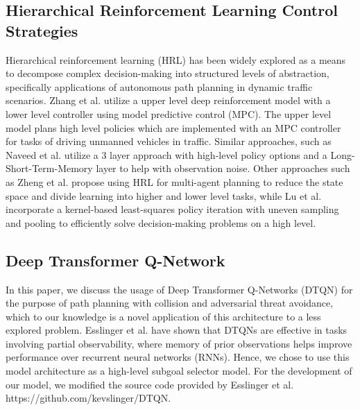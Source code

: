 \documentclass[letterpaper, 10 pt, conference]{ieeeconf}
\begin{document}
\subsection{Hierarchical Reinforcement Learning Control Strategies}

Hierarchical reinforcement learning (HRL) has been widely explored as a means to decompose complex decision-making into structured levels of abstraction, specifically applications of autonomous path planning in dynamic traffic scenarios. Zhang et al. \cite{zhang2025trajectory} utilize a upper level deep reinforcement model with a lower level controller using model predictive control (MPC). The upper level model plans high level policies which are implemented with an MPC controller for tasks of driving unmanned vehicles in traffic. Similar approaches, such as Naveed et al. \cite{9564634} utilize a 3 layer approach with high-level policy options and a Long-Short-Term-Memory layer to help with observation noise. Other approaches such as Zheng et al. \cite{7378017} propose using HRL for multi-agent planning to reduce the state space and divide learning into higher and lower level tasks, while Lu et al. \cite{9241055} incorporate a kernel-based least-squares policy iteration with uneven sampling and pooling to efficiently solve decision-making problems on a high level.

\subsection{Deep Transformer Q-Network}

In this paper, we discuss the usage of Deep Transformer Q-Networks (DTQN) for the purpose of path planning with collision and adversarial threat avoidance, which to our knowledge is a novel application of this architecture to a less explored problem. Esslinger et al. \cite{esslinger2022deep} have shown that DTQNs are effective in tasks involving partial observability, where memory of prior observations helps improve performance over recurrent neural networks (RNNs). Hence, we chose to use this model architecture as a high-level subgoal selector model. For the development of our model, we modified the source code provided by Esslinger et al. https://github.com/kevslinger/DTQN.

\end{document}
